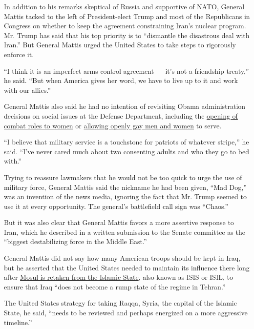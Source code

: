 In addition to his remarks skeptical of Russia and supportive of NATO,
General Mattis tacked to the left of President-elect Trump and most of
the Republicans in Congress on whether to keep the agreement
constraining Iran's nuclear program. Mr. Trump has said that his top
priority is to ``dismantle the disastrous deal with Iran.'' But General
Mattis urged the United States to take steps to rigorously enforce it.

``I think it is an imperfect arms control agreement --- it's not a
friendship treaty,'' he said. ``But when America gives her word, we have
to live up to it and work with our allies.''

General Mattis also said he had no intention of revisiting Obama
administration decisions on social issues at the Defense Department,
including the
\href{https://www.nytimes.com/2015/12/04/us/politics/combat-military-women-ash-carter.html}{opening
of combat roles to women} or
\href{http://www.nytimes.com/2010/12/23/us/politics/23military.html}{allowing
openly gay men and women} to serve.

``I believe that military service is a touchstone for patriots of
whatever stripe,'' he said. ``I've never cared much about two consenting
adults and who they go to bed with.''

Trying to reassure lawmakers that he would not be too quick to urge the
use of military force, General Mattis said the nickname he had been
given, ``Mad Dog,'' was an invention of the news media, ignoring the
fact that Mr. Trump seemed to use it at every opportunity. The general's
battlefield call sign was ``Chaos.''

But it was also clear that General Mattis favors a more assertive
response to Iran, which he described in a written submission to the
Senate committee as the ``biggest destabilizing force in the Middle
East.''

General Mattis did not say how many American troops should be kept in
Iraq, but he asserted that the United States needed to maintain its
influence there long after
\href{https://www.nytimes.com/2016/12/18/world/middleeast/iraq-mosul-islamic-state.html}{Mosul
is retaken from the Islamic State}, also known as ISIS or ISIL, to
ensure that Iraq ``does not become a rump state of the regime in
Tehran.''

The United States strategy for taking Raqqa, Syria, the capital of the
Islamic State, he said, ``needs to be reviewed and perhaps energized on
a more aggressive timeline.''

